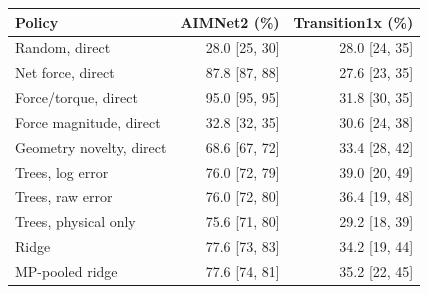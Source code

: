 \begin{tabular}{lrr}
\toprule
Policy & AIMNet2 (\%) & Transition1x (\%)\\
\midrule
Random, direct & 28.0 [25, 30] & 28.0 [24, 35] \\
Net force, direct & 87.8 [87, 88] & 27.6 [23, 35] \\
Force/torque, direct & 95.0 [95, 95] & 31.8 [30, 35] \\
Force magnitude, direct & 32.8 [32, 35] & 30.6 [24, 38] \\
Geometry novelty, direct & 68.6 [67, 72] & 33.4 [28, 42] \\
Trees, log error & 76.0 [72, 79] & 39.0 [20, 49] \\
Trees, raw error & 76.0 [72, 80] & 36.4 [19, 48] \\
Trees, physical only & 75.6 [71, 80] & 29.2 [18, 39] \\
Ridge & 77.6 [73, 83] & 34.2 [19, 44] \\
MP-pooled ridge & 77.6 [74, 81] & 35.2 [22, 45] \\
\bottomrule
\end{tabular}

